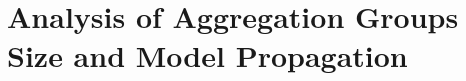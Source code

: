 \begin{comment}
\section{Analysis of Propagation Effects}

This must be updated if new propegation experiments are added

As mentioned in Section \ref{sec:PropagationPubModel}, we hypothesized that we could improve the overall classification accuracy of our system by publishing the aggregated models generated. In this section we present the effects of publishing method. Figure \ref{fig:RegRangeTestPubParty} shows the case where each group of peers only share the perturbed, aggregate model among themselves, while Figure \ref{fig:RegRangeTestPubAll} shows the results the model is sent to all existing peers. 

The most obvious effect of globally publishing models is that the standard deviation is much lower than the group publishing case. This is not surprising.

The truth is probably somewhere in the middle - we can't expect to easily publish models globally in all settings. Additionally, there might be situations were global publishing could be detrimental to real world performance - for instance, if there are strong geographical, temporal or demographic trends, it might be better to limit the amount of model sharing to suitable subsets.

\todo[inline]{Add figure to results that deal with comparing party vs all}

As the previous experiment indicates that publishing newly made models to as many peers as possible is better \todo{Add a reflection talking about why this makes sense.}, we performed an additional experiment to determine whether it in such a scenario would be better to perform many aggregations with fewer models included in each aggregate or performing few aggregations including many models. This was achieved by testing performance with a range of values. In the experiment, each peer can only participate in a single aggregation before reaching the limit set by the privacy guarantee. For example, given a set of 50 peers, a aggregation size of 25 can only publish two aggregated models.

\end{comment}

\section{Analysis of Aggregation Groups Size and Model Propagation}

